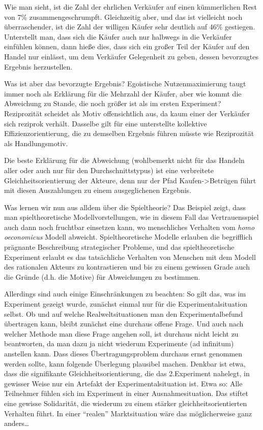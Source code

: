 Wie man sieht, ist die Zahl der ehrlichen Verkäufer auf einen kümmerlichen Rest
von 7\% zusammengeschrumpft. Gleichzeitig aber, und das ist vielleicht noch
überraschender, ist die Zahl der willigen Käufer sehr deutlich
auf 46\% gestiegen. Unterstellt man, dass sich die Käufer auch nur halbwegs in
die Verkäufer einfühlen können, dann hieße dies, dass sich ein großer Teil der
Käufer auf den Handel nur einlässt, um dem Verkäufer Gelegenheit zu geben,
dessen bevorzugtes Ergebnis herzustellen.

Was ist aber das bevorzugte Ergebnis? Egoistische Nutzenmaximierung taugt immer
noch als Erklärung für die Mehrzahl der Käufer, aber wie kommt die Abweichung
zu Stande, die noch größer ist als im ersten Experiment? Reziprozität scheidet
als Motiv offensichtlich aus, da kaum einer der Verkäufer sich reziprok
verhält. Dasselbe gilt für eine unterstellte kollektive Effizienzorientierung,
die zu demselben Ergebnis führen müsste wie Reziprozität als Handlungsmotiv. 

Die beste Erklärung für die Abweichung (wohlbemerkt nicht für das Handeln aller
oder auch nur für den Durchschnittstypus) ist eine verbreitete
Gleichheitsorientierung der Akteure, denn nur der Pfad Kaufen->Betrügen führt
mit diesen Auszahlungen zu einem ausgeglichenen Ergebnis. 

Was lernen wir nun aus alldem über die Spieltheorie? Das Beispiel zeigt, dass
man spieltheoretische Modellvorstellungen, wie in diesem Fall das
Vertrauensspiel auch dann noch fruchtbar einsetzen kann, wo menschliches
Verhalten vom {\em homo oeconomicus} Modell abweicht. Spieltheoretische
Modelle erlauben die begrifflich prägnante Beschreibung strategischer Probleme, und das
spieltheoretische Experiment erlaubt es das tatsächliche Verhalten von Menschen
mit dem Modell des rationalen Akteurs zu kontrastieren und bis zu einem
gewissen Grade auch die Gründe (d.h. die Motive) für Abweichungen zu bestimmen.

Allerdings sind auch einige Einschränkungen zu beachten: So gilt das, was
im Experiment gezeigt wurde, zunächst einmal nur für die Experimentalsituation
selbst. Ob und auf welche Realweltsituationen man den
Experimentalbefund übertragen kann, bleibt zunächst eine durchaus offene Frage.
Und auch nach welcher Methode man diese Frage angehen soll, ist durchaus nicht
leicht zu beantworten, da man dazu ja nicht wiederum Experimente (ad infinitum)
anstellen kann. Dass dieses Übertragungsproblem durchaus ernst genommen werden
sollte, kann folgende Überlegung plausibel machen. Denkbar ist etwa, dass die
signifikante Gleichheitsorientierung, die das 2.Experiment nahelegt, in
gewisser Weise nur ein Artefakt der Experimentalsituation ist. Etwa so: Alle
Teilnehmer fühlen sich im Experiment in einer Ausnahmesituation. Das stiftet
eine gewisse Solidarität, die wiederum zu einem stärker
gleichheitsorientierten Verhalten führt. In einer "`realen"' Marktsituation wäre
das möglicherweise ganz anders\ldots

